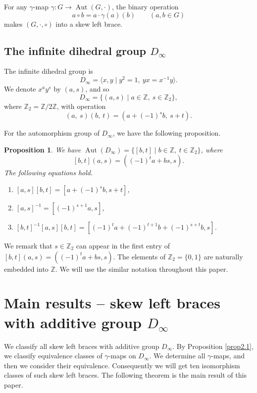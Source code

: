 \documentclass[12pt]{amsart}
\newtheorem{prop}[thm]{Proposition}
\theoremstyle{definition}
\newcommand{\Z}{\mathbb{Z}}
\newcommand{\Aut}{\operatorname{Aut}}
\begin{document}
For any $\gamma$-map $\gamma:G\to \Aut(G,\cdot)$,
the binary operation
$$a\circ b = a \cdot \gamma(a)(b) \qquad (a,b\in G)$$
makes $(G,\cdot,\circ)$ into a skew left brace.

\subsection{The infinite dihedral group $D_\infty$}
The infinite dihedral group is
$$D_\infty=\langle x,y\mid y^2=1,\ yx=x^{-1}y\rangle.$$
We denote $x^ay^s$ by $(a,s)$, and so
$$D_\infty=\{(a,s)\mid a\in \Z,\ s\in \Z_2\},$$
where $\Z_2=\Z/2\Z$, with operation
$$(a,\ s)(b,\ t)=(a+(-1)^s b,\ s+t).$$

For the automorphism group of $D_\infty$,
we have the following proposition.

\begin{prop}\label{prop2.2}
  We have
  $\Aut(D_\infty)=\{[b,t]\mid b\in \Z,\ t\in\Z_2\}$,
  where $$[b,t](a,s)=((-1)^ta+bs,s).$$
  The following equations hold.
  \begin{enumerate}[{\rm (1)}]
    \item $[a,s][b,t] = [a+(-1)^s b, s+t]$,
    \item $[a,s]^{-1}=[(-1)^{s+1}a,s]$,
    \item $[b,t]^{-1}[a,s][b,t]=[(-1)^ta+(-1)^{t+1}b+(-1)^{s+t}b,s]$.
  \end{enumerate}
\end{prop}

We remark that $s\in \Z_2$ can appear in
the first entry of $[b,t](a,s)=((-1)^ta+bs,s)$.
The elements of $\Z_2=\{0,1\}$ are naturally embedded into $\Z$. 
We will use the similar notation throughout this paper.

\section{Main results -- skew left braces with additive group $D_\infty$}
We classify all skew left braces with additive group $D_\infty$.
By Proposition \ref{prop2.1},
we classify equivalence classes of $\gamma$-maps on $D_\infty$.
We determine all $\gamma$-maps, and then we consider their equivalence.
Consequently we will get ten isomorphism classes of such skew left braces.
The following theorem is the main result of this paper.
\end{document}
